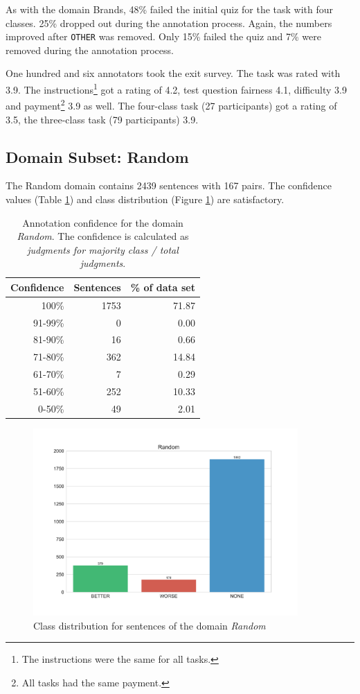 As with the domain Brands, 48\% failed the initial quiz for the task with four classes. 25\% dropped out during the annotation process. Again, the numbers improved after \texttt{OTHER} was removed. Only 15\% failed the quiz and 7\% were removed during the annotation process.

One hundred and six annotators took the exit survey. The task was rated with 3.9. The instructions\footnote{The instructions were the same for all tasks.} got a rating of 4.2, test question fairness 4.1, difficulty 3.9 and payment\footnote{All tasks had the same payment.} 3.9 as well. The four-class task (27 participants) got a rating of 3.5, the three-class task (79 participants) 3.9.

\subsection{Domain Subset: Random}
The Random domain contains 2439 sentences with 167 pairs. The confidence values (Table \ref{fig:random_agg}) and class distribution (Figure \ref{fig:random_fin}) are satisfactory.
\begin{table}[h]
\caption{Annotation confidence for the domain \emph{Random}. The confidence is calculated as \emph{judgments for majority class / total judgments}.}
\label{fig:random_agg}
\centering
\begin{tabular}{@{}rrr@{}}
\toprule
Confidence & Sentences & \% of data set \\
\midrule
100\%	&	1753	&	71.87	 \\ 
91-99\%	&	0	&	0.00	 \\ 
81-90\%	&	16	&	0.66	 \\ 
71-80\%	&	362	&	14.84	 \\ 
61-70\%	&	7	&	0.29	 \\ 
51-60\%	&	252	&	10.33	 \\ 
0-50\%	&	49	&	2.01	 \\ 
\bottomrule
\end{tabular}
\end{table}


\begin{figure}[h]
\centering
\caption{Class distribution for sentences of the domain \emph{Random}}
\label{fig:random_fin}
\includegraphics[width=0.9\textwidth]{images/dataset/Random-dist}
\end{figure}



